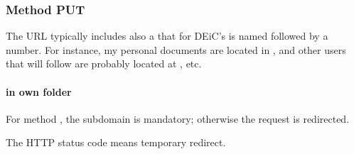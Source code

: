 \documentclass[a4paper,12pt,english]{sphinxhowto}
\begin{document}


\subsubsection{Method PUT}
\label{\detokenize{Sciencedata_dk:method-put}}
The URL typically includes also a  that for DEiC’s 
is named  followed by a number. For instance, my personal documents are located in ,
and other users that will follow are probably located at , etc.


\paragraph{ in own folder}
\label{\detokenize{Sciencedata_dk:put-in-own-folder}}
For method , the subdomain is mandatory; otherwise the request is redirected.

\begin{sphinxVerbatim}[commandchars=\\\{\},formatcom=\footnotesize]
   

\end{sphinxVerbatim}

The HTTP status code  means temporary redirect.
\end{document}
